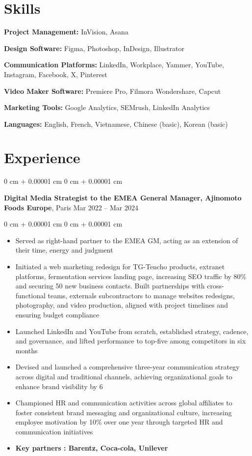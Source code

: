 \documentclass[10pt, letterpaper]{article}
\newenvironment{highlights}{
    \begin{itemize}[
        topsep=0.10 cm,
        parsep=0.10 cm,
        partopsep=0pt,
        itemsep=0pt,
        leftmargin=0 cm + 10pt
    ]
}{
    \end{itemize}
} %
\newenvironment{onecolentry}{
    \begin{adjustwidth}{
        0 cm + 0.00001 cm
    }{
        0 cm + 0.00001 cm
    }
}{
    \end{adjustwidth}
} %
\newenvironment{twocolentry}[2][]{
    \onecolentry
    \def\secondColumn{#2}
    \setcolumnwidth{\fill, 3.5 cm}
    \begin{paracol}{2}
}{
    \switchcolumn \raggedleft \secondColumn
    \end{paracol}
    \endonecolentry
} %
\begin{document}
    
    \section{Skills}
        \textbf{Project Management:} InVision, Asana

        \textbf{Design Software:} Figma, Photoshop, InDesign, Illustrator

        \textbf{Communication Platforms:} LinkedIn, Workplace, Yammer, YouTube, Instagram, Facebook, X, Pinterest

        \textbf{Video Maker Software:} Premiere Pro, Filmora Wondershare, Capcut

        \textbf{Marketing Tools:} Google Analytics, SEMrush, LinkedIn Analytics
        
        \textbf{Languages:} English, French, Vietnamese, Chinese (basic), Korean (basic)
    
    \section{Experience}

        \begin{twocolentry}{
            Mar 2022 – Mar 2024
        }
            \textbf{Digital Media Strategist to the EMEA General Manager, Ajinomoto Foods Europe}, Paris\end{twocolentry}

        \vspace{0.10 cm}
        \begin{onecolentry}
            \begin{highlights}
                \item Served as right-hand partner to the EMEA GM, acting as an extension of their time, energy and judgment
                \item Initiated a web marketing redesign for TG-Tencho products, extranet platforms, fermentation services landing page, increasing SEO traffic by 80\% and securing 50 new business contacts. Built partnerships with cross-functional teams, externals subcontractors to manage websites redesigns, photography, and video production,
aligned with project timelines and ensuring budget compliance
\item Launched LinkedIn and YouTube from scratch, established strategy, cadence, and governance, and lifted
performance to top-five among competitors in six months
\item Devised and launched a comprehensive three-year communication strategy across digital and traditional
channels, achieving organizational goals to enhance brand visibility by 6%
\item Championed HR and communication activities across global affiliates to foster consistent brand messaging and
organizational culture, increasing employee motivation by 10\% over one year through targeted HR and
communication initiatives

\item \textbf{Key partners : Barentz, Coca-cola, Unilever}
      
            \end{highlights}
        \end{onecolentry}
\end{document}
